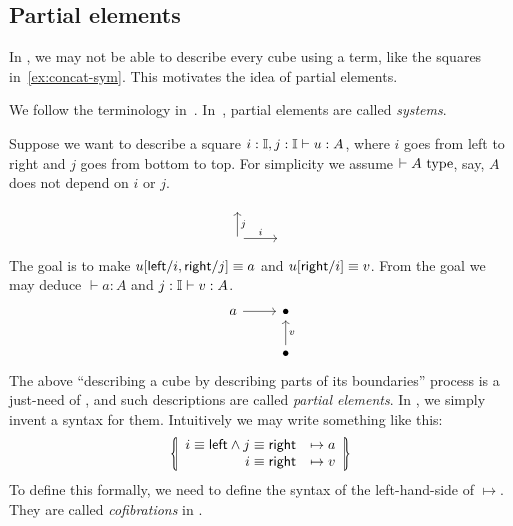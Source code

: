 \subsection{Partial elements}\label{sub:partial}
In \CTT, we may not be able to describe every cube using a term,
like the squares in~\cref{ex:concat-sym}.
This motivates the idea of partial elements.
\begin{terminology}
We follow the terminology in~\cite{CubicalAgda}.
In~\cite{CCHM}, partial elements are called \textit{systems}.
\end{terminology}
Suppose we want to describe a square $i:\mathbb{I},j:\mathbb{I}\vdash u:A$,
where $i$ goes from left to right and $j$ goes from bottom to top.
For simplicity we assume $\vdash A~\text{type}$, say, $A$ does not depend on $i$ or $j$.
\[\begin{tikzcd}
	{} \\
	{} & {}
	\arrow["i", from=2-1, to=2-2]
	\arrow["j"', from=2-1, to=1-1]
\end{tikzcd}\]
The goal is to make $u[\textsf{left}/i, \textsf{right}/j]\equiv a$ and $u[\textsf{right}/i]\equiv v$.
From the goal we may deduce $\vdash a:A$ and $j:\mathbb{I}\vdash v:A$.
\[\begin{tikzcd}
	a & \bullet \\
	& \bullet
	\arrow[from=1-1, to=1-2]
	\arrow["v"', from=2-2, to=1-2]
\end{tikzcd}\]
The above ``describing a cube by describing parts of its boundaries''
process is a just-need of \CTT, and such descriptions are called \textit{partial elements}.
In \CTT, we simply invent a syntax for them.
Intuitively we may write something like this:
\[\lrbbar{\begin{array}{rc}
  i\equiv\lcon \land j\equiv\rcon&\mapsto a\\
  i\equiv\rcon &\mapsto v
\end{array}}\]
To define this formally, we need to define the syntax of the left-hand-side of $\mapsto$.
They are called \textit{cofibrations} in \CTT.
